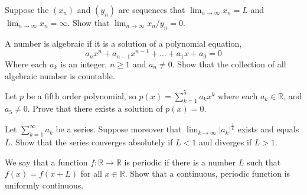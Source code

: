 \documentclass[12pt]{article}
\makeatletter
\theoremstyle{homework}
\newenvironment{exercise}[1]
{\def\@currentlabel{#1}\exercisecore}
{\endexercisecore}
\newcommand{\Reals}{\ensuremath{\mathbb R}}
\makeatother
\begin{document}
\begin{exercise}{1} Suppose the $(x_n)$ and $(y_n)$ are sequences that $\lim_{n \to  \infty} x_n = L$ and $\lim_{n \to  \infty} x_n = \infty$.
  Show that $\lim_{n \to  \infty} x_n/y_n = 0$. 
\end{exercise}
\vspace{.5in}




\begin{exercise}{2} A number is algebraic if it is a solution of a polynomial equation,
  \begin{equation*}
    a_nx^n + a_{n-1}x^{n-1}+\dots+a_1x + a_0 = 0
  \end{equation*}
  Where each $a_k$ is an integer, $n \geq 1$ and $a_n \neq 0$. Show that the collection of all algebraic 
  number is countable.\\
\end{exercise}
\vspace{.5in}


\begin{exercise}{3} Let $p$ be a fifth order polynomial, so $p(x) = \sum_{k = 1}^5 a_kx^k$ where each 
  $a_k \in \Reals$, and $a_5 \neq 0$. Prove that there exists a solution of $p(x) = 0$.\\
  
\end{exercise}
\vspace{.5in}




\begin{exercise}{4} Let $\sum_{k = 1}^{\infty}a_k$ be a series. Suppose moreover that $\lim_{k \to \infty} |a_k|^{\frac{1}{k}}$
  exists and equals $L$. Show that the series converges absolutely if $L<1$ and diverges if $L>1$. \\
\end{exercise}
\vspace{.5in}



\begin{exercise}{5} We say that a function $f: \Reals \to \Reals$ is periodic if there is a number $L$ such that $f(x) = f(x + L)$
  for all $x \in \Reals$. Show that a continuous, periodic function is uniformly continuous.\\
  
\end{exercise}
\vspace{.5in}
\end{document}
